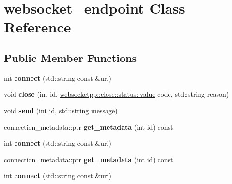 \hypertarget{classwebsocket__endpoint}{}\section{websocket\+\_\+endpoint Class Reference}
\label{classwebsocket__endpoint}
\subsection*{Public Member Functions}
\begin{DoxyCompactItemize}
\item 
int {\bfseries connect} (std\+::string const \&uri)\hypertarget{classwebsocket__endpoint_a5850523b829e145793d42e137d5eb8c0}{}\label{classwebsocket__endpoint_a5850523b829e145793d42e137d5eb8c0}

\item 
void {\bfseries close} (int id, \hyperlink{namespacewebsocketpp_1_1close_1_1status_a8614a5c4733d708e2d2a32191c5bef84}{websocketpp\+::close\+::status\+::value} code, std\+::string reason)\hypertarget{classwebsocket__endpoint_ac18bcc30c3894c74c9ad028b47c299f9}{}\label{classwebsocket__endpoint_ac18bcc30c3894c74c9ad028b47c299f9}

\item 
void {\bfseries send} (int id, std\+::string message)\hypertarget{classwebsocket__endpoint_aaae3d15cae0c3d7fd134ca28676e53cc}{}\label{classwebsocket__endpoint_aaae3d15cae0c3d7fd134ca28676e53cc}

\item 
connection\+\_\+metadata\+::ptr {\bfseries get\+\_\+metadata} (int id) const\hypertarget{classwebsocket__endpoint_a5896c27213953d2d33b88e117b1971f6}{}\label{classwebsocket__endpoint_a5896c27213953d2d33b88e117b1971f6}

\item 
int {\bfseries connect} (std\+::string const \&uri)\hypertarget{classwebsocket__endpoint_a5850523b829e145793d42e137d5eb8c0}{}\label{classwebsocket__endpoint_a5850523b829e145793d42e137d5eb8c0}

\item 
connection\+\_\+metadata\+::ptr {\bfseries get\+\_\+metadata} (int id) const\hypertarget{classwebsocket__endpoint_a5896c27213953d2d33b88e117b1971f6}{}\label{classwebsocket__endpoint_a5896c27213953d2d33b88e117b1971f6}

\item 
int {\bfseries connect} (std\+::string const \&uri)\hypertarget{classwebsocket__endpoint_a5850523b829e145793d42e137d5eb8c0}{}\label{classwebsocket__endpoint_a5850523b829e145793d42e137d5eb8c0}


\end{DoxyCompactItemize}
